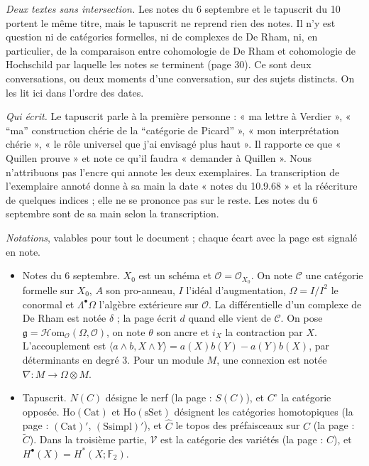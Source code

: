 \documentclass[11pt,a4paper]{article}
\begin{document}
\emph{Deux textes sans intersection.} Les notes du 6 septembre et le tapuscrit
du 10 portent le même titre, mais le tapuscrit ne reprend rien des notes. Il n'y
est question ni de catégories formelles, ni de complexes de De Rham, ni, en
particulier, de la comparaison entre cohomologie de De Rham et cohomologie de
Hochschild par laquelle les notes se terminent (page 30). Ce sont deux
conversations, ou deux moments d'une conversation, sur des sujets distincts. On
les lit ici dans l'ordre des dates.

\emph{Qui écrit.} Le tapuscrit parle à la première personne : « ma lettre à
Verdier », « “ma” construction chérie de la “catégorie de Picard” », « mon
interprétation chérie », « le rôle universel que j'ai envisagé plus haut ». Il
rapporte ce que « Quillen prouve » et note ce qu'il faudra « demander à
Quillen ». Nous n'attribuons pas l'encre qui annote les deux exemplaires. La
transcription de l'exemplaire annoté donne à sa main la date « notes du
10.9.68 » et la réécriture de quelques indices ; elle ne se prononce pas sur
le reste. Les notes du 6 septembre sont de sa main selon la transcription.

\emph{Notations}, valables pour tout le document ; chaque écart avec la page est
signalé en note.

\begin{itemize}
  \item Notes du 6 septembre. $X_0$ est un schéma et $\mathcal{O} =
  \mathcal{O}_{X_0}$. On note $\mathcal{C}$ une catégorie formelle sur $X_0$, $A$
  son pro-anneau, $I$ l'idéal d'augmentation, $\Omega = I/I^{2}$ le conormal et
  $\Lambda^{\bullet}\Omega$ l'algèbre extérieure sur $\mathcal{O}$. La
  différentielle d'un complexe de De Rham est notée $\delta$ ; la page écrit $d$
  quand elle vient de $\mathcal{C}$. On pose $\mathfrak{g} =
  \mathcal{H}\mathrm{om}_{\mathcal{O}}(\Omega, \mathcal{O})$, on note $\theta$ son
  ancre et $i_X$ la contraction par $X$. L'accouplement est $\langle a \wedge b, X
  \wedge Y\rangle = a(X)b(Y) - a(Y)b(X)$, par déterminants en degré 3. Pour un
  module $M$, une connexion est notée $\nabla : M \to \Omega \otimes M$.
  \item Tapuscrit. $N(C)$ désigne le nerf (la page : $S(C)$), et $C^{\circ}$ la
  catégorie opposée. $\mathrm{Ho}(\mathrm{Cat})$ et $\mathrm{Ho}(\mathrm{sSet})$
  désignent les catégories homotopiques (la page : $(\mathrm{Cat})'$,
  $(\mathrm{Ssimpl})'$), et $\widehat{C}$ le topos des préfaisceaux sur $C$ (la
  page : $\widetilde{C}$). Dans la troisième partie, $\mathcal{V}$ est la
  catégorie des variétés (la page : $C$), et $H^{\bullet}(X) = H^{*}(X;
  \mathbb{F}_2)$.
\end{itemize}
\end{document}
